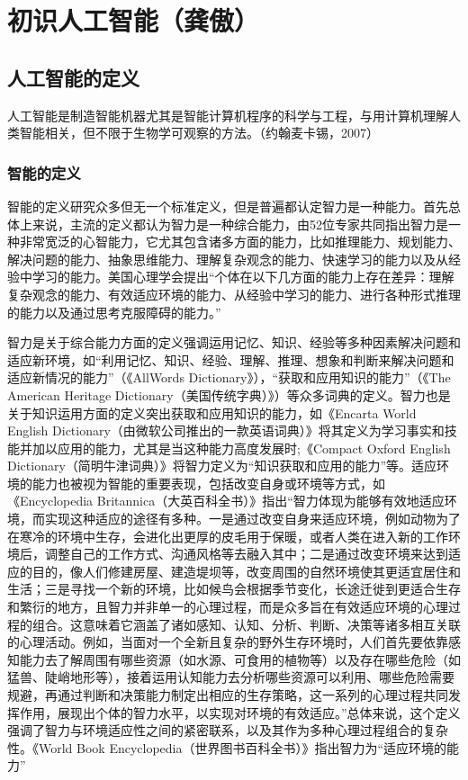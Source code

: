 \chapter{初识人工智能（龚傲）}


\section{人工智能的定义}
人工智能是制造智能机器尤其是智能计算机程序的科学与工程，与用计算机理解人类智能相关，但不限于生物学可观察的方法。（约翰麦卡锡，2007）
\subsection{智能的定义}
智能的定义研究众多但无一个标准定义，但是普遍都认定智力是一种能力。首先总体上来说，主流的定义都认为智力是一种综合能力，由52位专家共同指出智力是一种非常宽泛的心智能力，它尤其包含诸多方面的能力，比如推理能力、规划能力、解决问题的能力、抽象思维能力、理解复杂观念的能力、快速学习的能力以及从经验中学习的能力。美国心理学会提出“个体在以下几方面的能力上存在差异：理解复杂观念的能力、有效适应环境的能力、从经验中学习的能力、进行各种形式推理的能力以及通过思考克服障碍的能力。”


智力是关于综合能力方面的定义强调运用记忆、知识、经验等多种因素解决问题和适应新环境，如“利用记忆、知识、经验、理解、推理、想象和判断来解决问题和适应新情况的能力”（《AllWords Dictionary》），“获取和应用知识的能力”（《The American Heritage Dictionary（美国传统字典）》）等众多词典的定义。智力也是关于知识运用方面的定义突出获取和应用知识的能力，如《Encarta World English Dictionary（由微软公司推出的一款英语词典）》将其定义为学习事实和技能并加以应用的能力，尤其是当这种能力高度发展时;《Compact Oxford English Dictionary（简明牛津词典）》将智力定义为“知识获取和应用的能力”等。适应环境的能力也被视为智能的重要表现，包括改变自身或环境等方式，如《Encyclopedia Britannica（大英百科全书）》指出“智力体现为能够有效地适应环境，而实现这种适应的途径有多种。一是通过改变自身来适应环境，例如动物为了在寒冷的环境中生存，会进化出更厚的皮毛用于保暖，或者人类在进入新的工作环境后，调整自己的工作方式、沟通风格等去融入其中；二是通过改变环境来达到适应的目的，像人们修建房屋、建造堤坝等，改变周围的自然环境使其更适宜居住和生活；三是寻找一个新的环境，比如候鸟会根据季节变化，长途迁徙到更适合生存和繁衍的地方，且智力并非单一的心理过程，而是众多旨在有效适应环境的心理过程的组合。这意味着它涵盖了诸如感知、认知、分析、判断、决策等诸多相互关联的心理活动。例如，当面对一个全新且复杂的野外生存环境时，人们首先要依靠感知能力去了解周围有哪些资源（如水源、可食用的植物等）以及存在哪些危险（如猛兽、陡峭地形等），接着运用认知能力去分析哪些资源可以利用、哪些危险需要规避，再通过判断和决策能力制定出相应的生存策略，这一系列的心理过程共同发挥作用，展现出个体的智力水平，以实现对环境的有效适应。”总体来说，这个定义强调了智力与环境适应性之间的紧密联系，以及其作为多种心理过程组合的复杂性。《World Book Encyclopedia（世界图书百科全书）》指出智力为“适应环境的能力”


